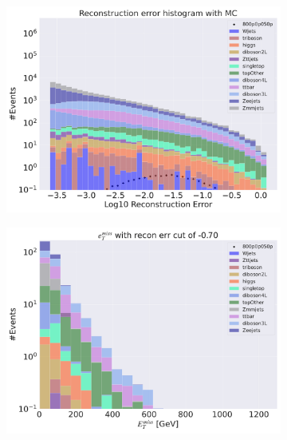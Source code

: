 \begin{figure}[H]
    \centering
    \begin{subfigure}{.40\textwidth}
        \includegraphics[width=\textwidth]{Figures/AE_testing/small/3lep/b_data_recon_big_rm3_feats_sig_800p0p050p.pdf}
        \caption{ }
        \label{fig:AE_3lep_small_800_3}
    \end{subfigure}
    \hfill
    \begin{subfigure}{.40\textwidth}
        \includegraphics[width=\textwidth]{Figures/AE_testing/small/3lep/b_data_recon_big_rm3_feats_sig_800p0p050p_etmiss_recon_errcut_-0.70.pdf}
        \caption{}
        \label{fig:AE_3lep_small_etmiss_800_3}
    \end{subfigure}

\end{figure}
